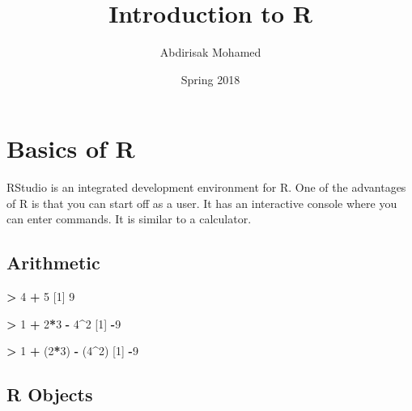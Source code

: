 \documentclass[]{article}
\title{Introduction to R}
\author{Abdirisak Mohamed}
\date{Spring 2018}
\newenvironment{Shaded}{\begin{snugshade}}{\end{snugshade}}
\newcommand{\DecValTok}[1]{\textcolor[rgb]{0.00,0.00,0.81}{#1}}
\newcommand{\StringTok}[1]{\textcolor[rgb]{0.31,0.60,0.02}{#1}}
\newcommand{\OperatorTok}[1]{\textcolor[rgb]{0.81,0.36,0.00}{\textbf{#1}}}
\newcommand{\NormalTok}[1]{#1}
\begin{document}
\maketitle

{
\setcounter{tocdepth}{2}
\tableofcontents
}
\section{Basics of R}\label{basics-of-r}

RStudio is an integrated development environment for R. One of the
advantages of R is that you can start off as a user. It has an
interactive console where you can enter commands. It is similar to a
calculator.

\subsection{Arithmetic}\label{arithmetic}

\begin{Shaded}
\begin{Highlighting}[]
\OperatorTok{>}\StringTok{ }\DecValTok{4} \OperatorTok{+}\StringTok{ }\DecValTok{5}
\NormalTok{[}\DecValTok{1}\NormalTok{] }\DecValTok{9}
\end{Highlighting}
\end{Shaded}

\begin{Shaded}
\begin{Highlighting}[]
\OperatorTok{>}\StringTok{  }\DecValTok{1} \OperatorTok{+}\StringTok{ }\DecValTok{2}\OperatorTok{*}\DecValTok{3} \OperatorTok{-}\StringTok{ }\DecValTok{4}\OperatorTok{^}\DecValTok{2}
\NormalTok{[}\DecValTok{1}\NormalTok{] }\OperatorTok{-}\DecValTok{9}
\end{Highlighting}
\end{Shaded}

\begin{Shaded}
\begin{Highlighting}[]
\OperatorTok{>}\StringTok{  }\DecValTok{1} \OperatorTok{+}\StringTok{ }\NormalTok{(}\DecValTok{2}\OperatorTok{*}\DecValTok{3}\NormalTok{) }\OperatorTok{-}\StringTok{ }\NormalTok{(}\DecValTok{4}\OperatorTok{^}\DecValTok{2}\NormalTok{)}
\NormalTok{[}\DecValTok{1}\NormalTok{] }\OperatorTok{-}\DecValTok{9}
\end{Highlighting}
\end{Shaded}

\subsection{R Objects}\label{r-objects}
\end{document}
